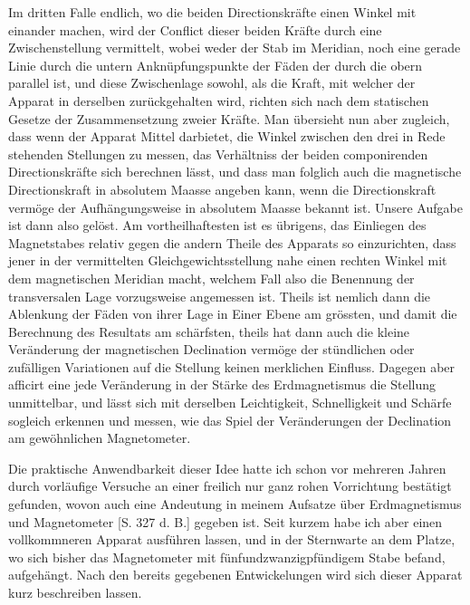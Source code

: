 Im dritten Falle endlich, wo die beiden Directionskräfte einen Winkel mit einander machen, wird der Conflict dieser beiden Kräfte durch eine Zwischenstellung vermittelt, wobei weder der Stab im Meridian, noch eine gerade Linie durch die untern Anknüpfungspunkte der Fäden der durch die obern parallel ist, und diese Zwischenlage sowohl, als die Kraft, mit welcher der Apparat in derselben zurückgehalten wird, richten sich nach dem statischen Gesetze der Zusammensetzung zweier Kräfte. Man übersieht nun aber zugleich, dass wenn der Apparat Mittel darbietet, die Winkel zwischen den drei in Rede stehenden Stellungen zu messen, das Verhältniss der beiden componirenden Directionskräfte sich berechnen lässt, und dass man folglich auch die magnetische Directionskraft in absolutem Maasse angeben kann, wenn die Directionskraft vermöge der Aufhängungsweise in absolutem Maasse bekannt ist. Unsere Aufgabe ist dann also gelöst. Am vortheilhaftesten ist es übrigens, das Einliegen des Magnetstabes relativ gegen die andern Theile des Apparats so einzurichten, dass jener in der vermittelten Gleichgewichtsstellung nahe einen rechten Winkel mit dem magnetischen Meridian macht, welchem Fall also die Benennung der transversalen Lage vorzugsweise angemessen ist. Theils ist nemlich dann die Ablenkung der Fäden
von ihrer Lage in Einer Ebene am grössten, und damit die Berechnung des Resultats am schärfsten, theils hat dann auch die kleine Veränderung der magnetischen Declination vermöge der stündlichen oder zufälligen Variationen auf die Stellung keinen merklichen Einfluss. Dagegen aber afficirt eine jede Veränderung in der Stärke des Erdmagnetismus die Stellung unmittelbar, und lässt sich mit derselben Leichtigkeit, Schnelligkeit und Schärfe sogleich erkennen und messen, wie das Spiel der Veränderungen der Declination am gewöhnlichen Magnetometer.

Die praktische Anwendbarkeit dieser Idee hatte ich schon vor mehreren Jahren durch vorläufige Versuche an einer freilich nur ganz rohen Vorrichtung bestätigt gefunden, wovon auch eine Andeutung in meinem Aufsatze über Erdmagnetismus und Magnetometer [S. 327 d. B.] gegeben ist. Seit kurzem habe ich aber einen vollkommneren Apparat ausführen lassen, und in der Sternwarte an dem Platze, wo sich bisher das Magnetometer mit fünfundzwanzigpfündigem Stabe befand, aufgehängt. Nach den bereits gegebenen Entwickelungen wird sich dieser Apparat kurz beschreiben lassen.

